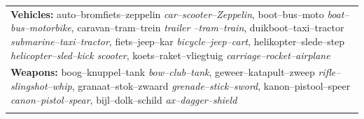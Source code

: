 \documentclass[doc]{apa6}
\begin{document}
\begin{appendix}
\begin{small}
\begin{longtable}{p{14cm}}
\textbf{Vehicles:} auto--bromfiets--zeppelin \textit{car--scooter--Zeppelin}, boot--bus--moto \textit{ boat--bus--motorbike},
caravan--tram--trein \textit{trailer --tram--train}, duikboot--taxi--tractor \textit{ submarine--taxi--tractor},
fiets--jeep--kar \textit{bicycle--jeep--cart}, helikopter--slede--step \textit{ helicopter--sled--kick scooter},
koets--raket--vliegtuig \textit{carriage--rocket--airplane}
\smallskip \\

\textbf{Weapons:} boog--knuppel--tank \textit{bow--club--tank}, geweer--katapult--zweep \textit{ rifle--slingshot--whip},
granaat--stok--zwaard \textit{grenade--stick--sword}, kanon--pistool--speer \textit{ canon--pistol--spear},
bijl--dolk--schild \textit{ax--dagger--shield}\\
\label{table:AppendixBasicLevelTriads}
\end{longtable}
\end{small}

\end{appendix}
\end{document}

